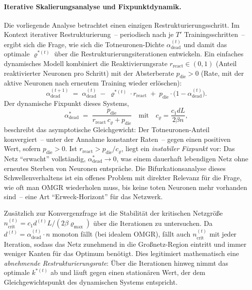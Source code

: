 ﻿\documentclass[12pt, a4paper, openany]{report}
\begin{document}
\paragraph{Iterative Skalierungsanalyse und Fixpunktdynamik.}
Die vorliegende Analyse betrachtet einen einzigen Restrukturierungsschritt.
Im Kontext iterativer Restrukturierung~-- periodisch nach je $T'$
Trainingsschritten~-- ergibt sich die Frage, wie sich die Totneuronen-Dichte
$\alpha_{\mathrm{dead}}^{(t)}$ und damit das optimale $\varrho^{*(t)}$ über
die Restrukturierungsiterationen entwickeln.  Ein einfaches dynamisches
Modell kombiniert die Reaktivierungsrate $r_{\mathrm{react}} \in (0,1)$
(Anteil reaktivierter Neuronen pro Schritt) mit der Absterberate
$p_{\mathrm{die}} > 0$ (Rate, mit der aktive Neuronen nach erneutem Training
wieder erlöschen):
\[
  \alpha_{\mathrm{dead}}^{(t+1)}
  \;=\;
  \alpha_{\mathrm{dead}}^{(t)}
  \;-\; \varrho^{*(t)} \cdot r_{\mathrm{react}}
  \;+\; p_{\mathrm{die}} \cdot \bigl(1 - \alpha_{\mathrm{dead}}^{(t)}\bigr).
\]
Der dynamische Fixpunkt dieses Systems,
\[
  \alpha^*_{\mathrm{dead}}
  \;=\; \frac{p_{\mathrm{die}}}{r_{\mathrm{react}}\,c_\varrho + p_{\mathrm{die}}}
  \quad \text{mit}\quad
  c_\varrho = \frac{c_1 d L}{2\beta n},
\]
beschreibt das asymptotische Gleichgewicht: Der Totneuronen-Anteil
konvergiert~-- unter der Annahme konstanter Raten~-- gegen einen positiven
Wert, sofern $p_{\mathrm{die}} > 0$.  Ist $r_{\mathrm{react}} > p_{\mathrm{die}}/c_\varrho$,
liegt ein \emph{instabiler Fixpunkt} vor: Das Netz ``erwacht'' vollständig,
$\alpha^*_{\mathrm{dead}} \to 0$, was einem dauerhaft lebendigen Netz ohne
erneutes Sterben von Neuronen entspräche.    Die Bifurkationsanalyse dieses
Schwellenverhaltens ist ein offenes Problem mit direkter Relevanz für die
Frage, wie oft man OMGR wiederholen muss, bis keine toten Neuronen mehr
vorhanden sind~-- eine Art ``Erweck-Horizont'' für das Netzwerk.

Zusätzlich zur Konvergenzfrage ist die Stabilität der kritischen Netzgröße
$n_{\mathrm{crit}}^{(t)} = c_1 d^{(t)} L / (2\beta\varrho_{\max})$ über die
Iterationen zu untersuchen.  Da $d^{(t)} = \alpha_{\mathrm{dead}}^{(t)} \cdot n$
monoton fällt (bei idealem OMGR), fällt auch $n_{\mathrm{crit}}^{(t)}$ mit
jeder Iteration, sodass das Netz zunehmend in die Großnetz-Region eintritt
und immer weniger Kanten für das Optimum benötigt.  Dies legitimiert
mathematisch eine \emph{abnehmende Restrukturierungsrate}: Über die
Iterationen hinweg nimmt das optimale $k^{*(t)}$ ab und läuft gegen einen
stationären Wert, der dem Gleichgewichtspunkt des dynamischen Systems entspricht.
\end{document}
